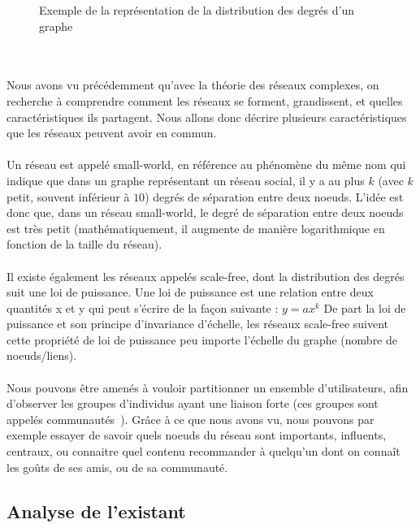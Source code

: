 \begin{titlepage}
{\begin{figure}[h]
\caption{Exemple de la représentation de la distribution des degrés d'un graphe}
\end{figure}
\\ \\ 
Nous avons vu précédemment qu'avec la théorie des réseaux complexes, on recherche à comprendre comment les réseaux se forment, grandissent, et quelles caractéristiques ils partagent. Nous allons donc décrire plusieurs caractéristiques que les réseaux peuvent avoir en commun.
\\ \\ 
Un réseau est appelé small-world, en référence au phénomène du même nom qui indique que dans un graphe représentant un réseau social, il y a au plus $k$ (avec $k$ petit, souvent inférieur à $10$) degrés de séparation entre deux noeuds. L'idée est donc que, dans un réseau small-world, le degré de séparation entre deux noeuds est très petit (mathématiquement, il augmente de manière logarithmique en fonction de la taille du réseau).
\\ \\ 
Il existe également les réseaux appelés scale-free, dont la distribution des degrés suit une loi de puissance. Une loi de puissance est une relation entre deux quantités x et y qui peut s'écrire de la façon suivante :
$ y = ax^k $
De part la loi de puissance et son principe d'invariance d'échelle, les réseaux scale-free suivent cette propriété de loi de puissance peu importe l'échelle du graphe (nombre de noeuds/liens).
\\ \\ 
Nous pouvons être amenés à vouloir partitionner un ensemble d'utilisateurs, afin d'observer les groupes d'individus ayant une liaison forte (ces groupes sont appelés communautés~\cite{communautes, structure}). Grâce à ce que nous avons vu, nous pouvons par exemple essayer de savoir quels noeuds du réseau sont importants, influents, centraux, ou connaitre quel contenu recommander à quelqu'un dont on connaît les goûts de ses amis, ou de sa communauté.
}


\newpage
\begin{center}
\begin{bf}
\section{Analyse de l'existant}
\end{bf}
\end{center}


\end{titlepage}
